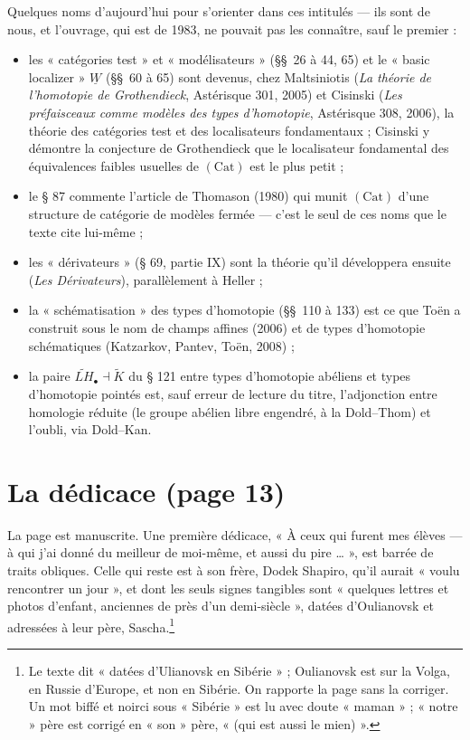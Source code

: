 \documentclass[11pt,a4paper]{article}
\begin{document}
Quelques noms d'aujourd'hui pour s'orienter dans ces intitulés --- ils sont
de nous, et l'ouvrage, qui est de 1983, ne pouvait pas les connaître, sauf
le premier :
\begin{itemize}
  \item les « catégories test » et « modélisateurs » (§§~26 à 44, 65) et le
  « basic localizer » $\underline{W}$ (§§~60 à 65) sont devenus, chez
  Maltsiniotis (\emph{La théorie de l'homotopie de Grothendieck}, Astérisque
  301, 2005) et Cisinski (\emph{Les préfaisceaux comme modèles des types
  d'homotopie}, Astérisque 308, 2006), la théorie des catégories test et des
  localisateurs fondamentaux ; Cisinski y démontre la conjecture de
  Grothendieck que le localisateur fondamental des équivalences faibles
  usuelles de $(\mathrm{Cat})$ est le plus petit ;
  \item le § 87 commente l'article de Thomason (1980) qui munit
  $(\mathrm{Cat})$ d'une structure de catégorie de modèles fermée --- c'est
  le seul de ces noms que le texte cite lui-même ;
  \item les « dérivateurs » (§ 69, partie IX) sont la théorie qu'il
  développera ensuite (\emph{Les Dérivateurs}), parallèlement à Heller ;
  \item la « schématisation » des types d'homotopie (§§~110 à 133) est ce
  que Toën a construit sous le nom de champs affines (2006) et de types
  d'homotopie schématiques (Katzarkov, Pantev, Toën, 2008) ;
  \item la paire $\widetilde{LH}_\bullet \dashv \widetilde{K}$ du § 121
  entre types d'homotopie abéliens et types d'homotopie pointés est, sauf
  erreur de lecture du titre, l'adjonction entre homologie réduite (le
  groupe abélien libre engendré, à la Dold--Thom) et l'oubli, via
  Dold--Kan.
\end{itemize}

\section*{La dédicace (page 13)}

La page est manuscrite. Une première dédicace, « À ceux qui furent mes
élèves --- à qui j'ai donné du meilleur de moi-même, et aussi du pire … »,
est barrée de traits obliques. Celle qui reste est à son frère, Dodek
Shapiro, qu'il aurait « voulu rencontrer un jour », et dont les seuls signes
tangibles sont « quelques lettres et photos d'enfant, anciennes de près d'un
demi-siècle », datées d'Oulianovsk et adressées à leur père,
Sascha.\footnote{Le texte dit « datées d'Ulianovsk en Sibérie » ; Oulianovsk
est sur la Volga, en Russie d'Europe, et non en Sibérie. On rapporte la page
sans la corriger. Un mot biffé et noirci sous « Sibérie » est lu avec doute
« maman » ; « notre » père est corrigé en « son » père, « (qui est aussi le
mien) ».}
\end{document}
